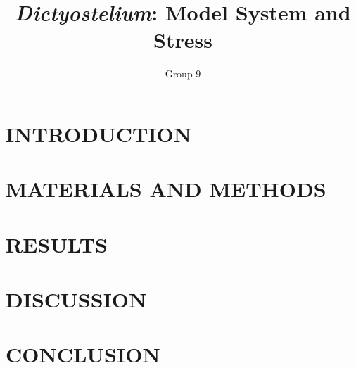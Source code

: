 \documentclass{article}
\title{\textbf{\textsl{Dictyostelium}: Model System and Stress}}
\author{Group 9}
\date{}
\begin{document}
\maketitle

\begin{abstract}

\end{abstract}

\section*{INTRODUCTION}


\section*{MATERIALS AND METHODS}


\section*{RESULTS}


\section*{DISCUSSION}


\section*{CONCLUSION}





\clearpage
\begin{appendices}

\end{appendices}
\end{document}
